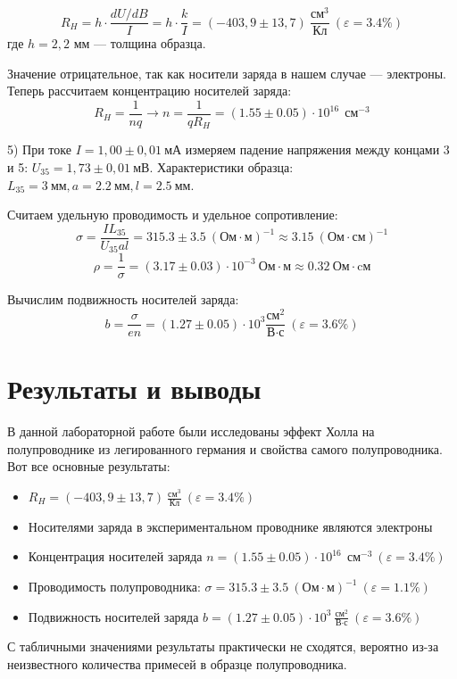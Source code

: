 \documentclass[a4paper, 14pt]{article}
\begin{document}
	\[R_H = h \cdot \frac{dU/dB}{I} = h \cdot \frac{k}{I} = (-403,9 \pm 13,7) \ \frac{\text{см}^3}{\text{Кл}} \ (\varepsilon = 3.4\%)\]
	где $h = 2,2$ мм --- толщина образца.
	
	Значение отрицательное, так как носители заряда в нашем случае --- электроны. Теперь рассчитаем концентрацию носителей заряда:
	\[R_H = \frac{1}{nq} \rightarrow n = \frac{1}{qR_H} = (1.55 \pm 0.05) \cdot 10^{16} \ \ \text{см}^{-3}\]
	
	5) При токе $I = 1,00 \pm 0,01~\text{мА}$ измеряем падение напряжения между концами 3 и 5: $U_{35} = 1,73 \pm 0,01~\text{мВ} $. Характеристики образца: $L_{35} = 3~\text{мм}, a = 2.2~\text{мм}, l = 2.5~\text{мм}$.
	
	Считаем удельную проводимость и удельное сопротивление:
	\[\sigma = \frac{IL_{35}}{U_{35}al} = 315.3 \pm 3.5 \ (\text{Ом}\cdot\text{м})^{-1} \approx  3.15 \ (\text{Ом}\cdot\text{см})^{-1}\]
	\[\rho = \frac{1}{\sigma} = (3.17 \pm 0.03) \cdot 10^{-3} \ \text{Ом}\cdot\text{м} \approx 0.32 \ \text{Ом}\cdot\text{cм}  \]
	
	Вычислим подвижность носителей заряда:
	\[b = \frac{\sigma}{en} = (1.27 \pm 0.05)  \cdot 10^3 \frac{\text{см}^2}{\text{В}\cdot \text{с}} \ (\varepsilon = 3.6\%)\]
	
	\section*{Результаты и выводы}
	
	В данной лабораторной работе были исследованы эффект Холла на полупроводнике из легированного германия и свойства самого полупроводника. Вот все основные результаты: 
	
	\begin{itemize}
		\item $R_H = (-403,9 \pm 13,7) \ \frac{\text{см}^3}{\text{Кл}} \ (\varepsilon = 3.4\%) $
		\item Носителями заряда в экспериментальном проводнике являются электроны
		\item Концентрация носителей заряда $n = (1.55 \pm 0.05) \cdot 10^{16} \ \ \text{см}^{-3} \ (\varepsilon = 3.4\%) $
		\item Проводимость полупроводника: $\sigma = 315.3 \pm 3.5 \ (\text{Ом}\cdot\text{м})^{-1} \ (\varepsilon = 1.1\%)  $
		\item Подвижность носителей заряда $b = (1.27 \pm 0.05)  \cdot 10^3 \ \frac{\text{см}^2}{\text{В}\cdot \text{с}} \ (\varepsilon = 3.6\%) $
	\end{itemize}
	С табличными значениями результаты практически не сходятся, вероятно из-за неизвестного количества примесей в образце полупроводника.
\end{document}
